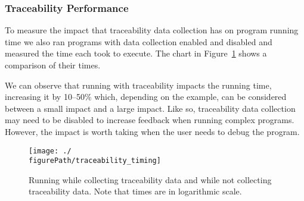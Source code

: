 \subsubsection{Traceability Performance}
To measure the impact that traceability data collection has on program running time we also ran programs with data collection enabled and disabled and measured the time each took to execute.
The chart in Figure~\ref{fig:traceability:timing} shows a comparison of their times.

We can observe that running with traceability impacts the running time, increasing it by 10--50\% which, depending on the example, can be considered between a small impact and a large impact.
Like so, traceability data collection may need to be disabled to increase feedback when running complex programs.
However, the impact is worth taking when the user needs to debug the program.

\begin{figure}
  \centering
  \texttt{[image: ./\\figurePath/traceability\_timing]}
  \caption{Running while collecting traceability data and while not collecting traceability data. Note that times are in logarithmic scale.}
  \label{fig:traceability:timing}
\end{figure}
